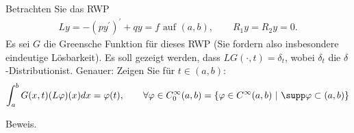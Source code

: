 \begin{exercise}
Betrachten Sie das RWP
\begin{align*}
  Ly = -(py^{\prime})^{\prime} + qy = f \text{ auf } (a,b), \qquad R_1y = R_2y = 0.
\end{align*}
Es sei $G$ die Greensche Funktion für dieses RWP (Sie fordern also insbesondere
eindeutige Lösbarkeit). Es soll gezeigt werden, dass $LG(\cdot,t) = \delta_t$,
wobei $\delta_t$ die \glqq$\delta$-Distribution\grqq ist. Genauer: Zeigen Sie für
$t \in (a,b):$
\begin{align*}
  \int_a^b G(x,t)(L\varphi)(x) dx = \varphi(t), \qquad
  \forall \varphi \in C_0^{\infty}(a,b) = \{\varphi \in C^{\infty}(a,b) ~|~ \supp \varphi \subset (a,b)\}
\end{align*}
\end{exercise}
\begin{solution}
Beweis.
\end{solution}
